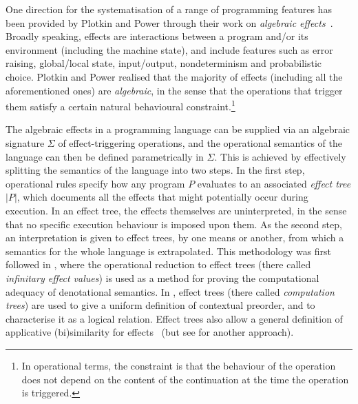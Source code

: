 One direction for the systematisation of a range of programming features has been provided by Plotkin and Power through their work on
 \emph{algebraic effects}~\cite{plotkin2001adequacy,PlotkinPower2002}. Broadly speaking, effects are interactions between a  program and/or its environment (including the machine state), and include features such as
 error raising, global/local state, input/output, nondeterminism and probabilistic choice. 
 Plotkin and Power realised that the majority of effects (including all the aforementioned ones) are \emph{algebraic}, in the sense that the operations that trigger them %
 satisfy a certain natural behavioural constraint.\footnote{In operational terms, the constraint  is that the behaviour of the operation does not depend on the content of the continuation at the time the operation is triggered.} 

The algebraic effects  in a programming language can  be supplied via an algebraic signature $\Sigma$ of effect-triggering operations,
and the operational semantics of the language can then be defined parametrically in $\Sigma$. 
This is achieved by effectively splitting the semantics of 
the language into two steps. In the first step, operational rules specify how any program $P$ evaluates 
to an associated \emph{effect tree} $|P|$, 
which documents  all the effects that might potentially occur during execution. %
In an effect tree, the effects themselves are uninterpreted, in the sense that no specific execution behaviour is imposed upon them. 
As the second step, an interpretation is given to effect trees, by one means or another, from which a semantics for the whole language is extrapolated.
This methodology was first followed in \cite{plotkin2001adequacy}, where the operational reduction to effect trees (there called \emph{infinitary effect values}) is used as a method for proving the computational adequacy of denotational semantics. 
In \cite{gom}, effect trees (there called \emph{computation trees}) are used to give a uniform definition of 
contextual preorder, %
and to characterise it as a logical relation.
Effect trees also allow a general definition of applicative (bi)similarity for effects~\cite{SV2018,Voor2018} (but see \cite{Ugo2017} for another approach).


